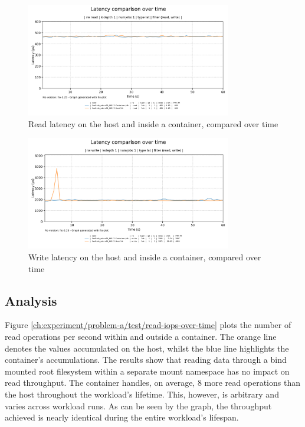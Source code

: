 \begin{figure}[H]
    \centering
    \includegraphics[width=0.8\textwidth]{images/results/sandisk-libaio-latency-read-comparison.png}
    \caption{Read latency on the host and inside a container, compared over time}
    \label{ch:experiment/problem-a/test/read-latency-over-time}
\end{figure}
\begin{figure}[H]
    \centering
    \includegraphics[width=0.8\textwidth]{images/results/sandisk-libaio-latency-write-comparison-2.png}
    \caption{Write latency on the host and inside a container, compared over time}
    \label{ch:experiment/problem-a/test/write-latency-over-time}
\end{figure}

\subsection{Analysis}
Figure \ref{ch:experiment/problem-a/test/read-iops-over-time} plots the number of read operations per second 
within and outside a container. The orange line denotes the values accumulated on the host, whilst the blue line 
highlights the container's accumulations. The results show that reading data through a bind mounted root filesystem 
within a separate mount namespace has no impact on read throughput. The container handles, on average,
8 more read operations than the host throughout the workload's lifetime. This, however, is arbitrary
and varies across workload runs. As can be seen by the graph, the throughput achieved is nearly 
identical during the entire workload's lifespan.

